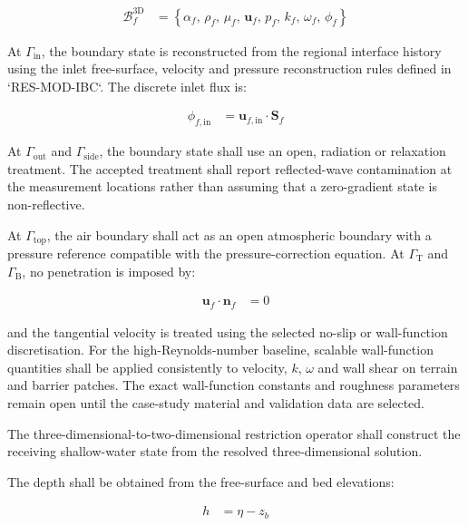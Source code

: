 \begin{align}
  \mathcal{B}_{f}^{\mathrm{3D}}
  &=
  \left\{
    \alpha_f,\,
    \rho_f,\,
    \mu_f,\,
    \mathbf{u}_f,\,
    p_f,\,
    k_f,\,
    \omega_f,\,
    \phi_f
  \right\}
  \label{eq:res-num-ibc-local-boundary-state}
\end{align}

At $\Gamma_{\mathrm{in}}$, the boundary state is reconstructed from
the regional interface history using the inlet free-surface, velocity
and pressure reconstruction rules defined in `RES-MOD-IBC`.
The discrete inlet flux is:

\begin{align}
  \phi_{f,\mathrm{in}}
  &=
  \mathbf{u}_{f,\mathrm{in}}
  \cdot
  \mathbf{S}_f
  \label{eq:res-num-ibc-local-inlet-face-flux}
\end{align}

At $\Gamma_{\mathrm{out}}$ and $\Gamma_{\mathrm{side}}$, the boundary
state shall use an open, radiation or relaxation treatment. The
accepted treatment shall report reflected-wave contamination at the
measurement locations rather than assuming that a zero-gradient state is
non-reflective.

At $\Gamma_{\mathrm{top}}$, the air boundary shall act as an open
atmospheric boundary with a pressure reference compatible with the
pressure-correction equation. At $\Gamma_{\mathrm{T}}$ and
$\Gamma_{\mathrm{B}}$, no penetration is imposed by:

\begin{align}
  \mathbf{u}_{f}
  \cdot
  \mathbf{n}_f
  &=
  0
  \label{eq:res-num-ibc-local-wall-no-penetration}
\end{align}

and the tangential velocity is treated using the selected no-slip or
wall-function discretisation. For the high-Reynolds-number baseline,
scalable wall-function quantities shall be applied consistently to
velocity, $k$, $\omega$ and wall shear on terrain and barrier patches.
The exact wall-function constants and roughness parameters remain open
until the case-study material and validation data are selected.

The three-dimensional-to-two-dimensional restriction operator shall
construct the receiving shallow-water state from the resolved
three-dimensional solution.

The depth shall be obtained from the free-surface and bed elevations:

\begin{align}
    h
    &=
    \eta-z_b
    \label{eq:res-num-ibc-restricted-depth}
\end{align}

